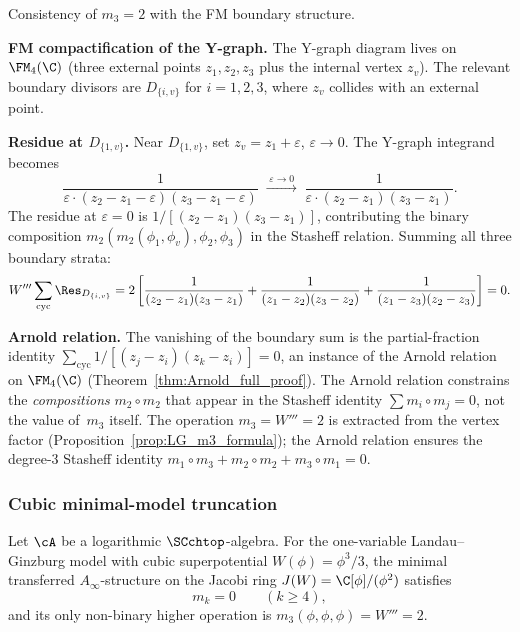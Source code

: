 \begin{computation}
\label{comp:m3_residue}
Consistency of $m_3 = 2$ with the FM boundary structure.

\textbf{FM compactification of the Y-graph.}
The Y-graph diagram lives on $\FM_4(\C)$ (three external points $z_1, z_2, z_3$ plus the internal vertex $z_v$). The relevant boundary divisors are $D_{\{i,v\}}$ for $i = 1, 2, 3$, where $z_v$ collides with an external point.

\textbf{Residue at \(D_{\{1,v\}}\).}
Near $D_{\{1,v\}}$, set $z_v = z_1 + \varepsilon$, $\varepsilon \to 0$. The Y-graph integrand becomes
\begin{equation}
\frac{1}{\varepsilon \cdot (z_2 - z_1 - \varepsilon)
 (z_3 - z_1 - \varepsilon)}
\;\xrightarrow{\;\varepsilon \to 0\;}
\;\frac{1}{\varepsilon \cdot (z_2 - z_1)(z_3 - z_1)}.
\end{equation}
The residue at $\varepsilon = 0$ is $1/[(z_2 - z_1)(z_3 - z_1)]$, contributing the binary composition $m_2(m_2(\phi_1, \phi_v), \phi_2, \phi_3)$ in the Stasheff relation. Summing all three boundary strata:
\begin{equation}
W''' \sum_{\text{cyc}} \Res_{D_{\{i,v\}}}
= 2 \left[
 \frac{1}{(z_2 - z_1)(z_3 - z_1)}
 + \frac{1}{(z_1 - z_2)(z_3 - z_2)}
 + \frac{1}{(z_1 - z_3)(z_2 - z_3)}
\right] = 0.
\end{equation}

\textbf{Arnold relation.}
The vanishing of the boundary sum is the partial-fraction identity $\sum_{\text{cyc}} 1/[(z_j - z_i)(z_k - z_i)] = 0$, an instance of the Arnold relation on $\FM_4(\C)$ (Theorem~\ref{thm:Arnold_full_proof}). The Arnold relation constrains the \emph{compositions} $m_2 \circ m_2$ that appear in the Stasheff identity $\sum m_i \circ m_j = 0$, not the value of~$m_3$ itself. The operation $m_3 = W''' = 2$ is extracted from the vertex factor (Proposition~\ref{prop:LG_m3_formula}); the Arnold relation ensures the degree-$3$ Stasheff identity $m_1 \circ m_3 + m_2 \circ m_2 + m_3 \circ m_1 = 0$.
\end{computation}

\subsubsection{Cubic minimal-model truncation}

\begin{theorem}
\label{thm:LG_truncation}
Let\/ $\cA$ be a logarithmic\/ $\SCchtop$-algebra.
For the one-variable Landau--Ginzburg model with cubic superpotential
$W(\phi)=\phi^3/3$, the minimal transferred \(A_\infty\)-structure on
the Jacobi ring \(J(W)=\C[\phi]/(\phi^2)\) satisfies
\begin{equation}
m_k=0\qquad(k\geq 4),
\end{equation}
and its only non-binary higher operation is
\(m_3(\phi,\phi,\phi)=W'''=2\).
\end{theorem}

